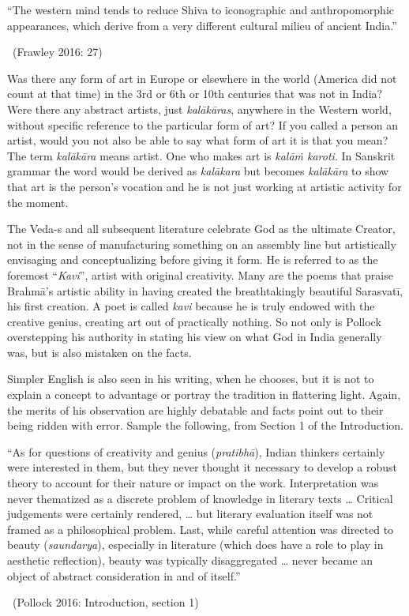 \begin{myquote}
“The western mind tends to reduce Shiva to iconographic and anthropomorphic appearances, which derive from a very different cultural milieu of ancient India.” 

~\hfill (Frawley 2016: 27)
\end{myquote}

Was there any form of art in Europe or elsewhere in the world (America did not count at that time) in the 3rd or 6th or 10th centuries that was not in India? Were there any abstract artists, just \textit{kalākāras}, anywhere in the Western world, without specific reference to the particular form of art? If you called a person an artist, would you not also be able to say what form of art it is that you mean? The term \textit{kalākāra} means artist. One who makes art is \textit{kalāṁ karoti}. In Sanskrit grammar the word would be derived as \textit{kalākara} but becomes \textit{kalākāra} to show that art is the person’s vocation and he is not just working at artistic activity for the moment.

The Veda-s and all subsequent literature celebrate God as the ultimate Creator, not in the sense of manufacturing something on an assembly line but artistically envisaging and conceptualizing before giving it form. He is referred to as the foremost “\textit{Kavi}”, artist with original creativity. Many are the poems that praise Brahmā’s artistic ability in having created the breathtakingly beautiful Sarasvatī, his first creation. A poet is called \textit{kavi} because he is truly endowed with the creative genius, creating art out of practically nothing. So not only is Pollock overstepping his authority in stating his view on what God in India generally was, but is also mistaken on the facts.

\newpage

Simpler English is also seen in his writing, when he chooses, but it is not to explain a concept to advantage or portray the tradition in flattering light. Again, the merits of his observation are highly debatable and facts point out to their being ridden with error. Sample the following, from Section 1 of the Introduction.

\begin{myquote}
“As for questions of creativity and genius (\textit{pratibhā}), Indian thinkers certainly were interested in them, but they never thought it necessary to develop a robust theory to account for their nature or impact on the work. Interpretation was never thematized as a discrete problem of knowledge in literary texts … Critical judgements were certainly rendered, … but literary evaluation itself was not framed as a philosophical problem. Last, while careful attention was directed to beauty (\textit{saundarya}), especially in literature (which does have a role to play in aesthetic reflection), beauty was typically disaggregated … never became an object of abstract consideration in and of itself.” 

~\hfill (Pollock 2016: Introduction, section 1)
\end{myquote}

